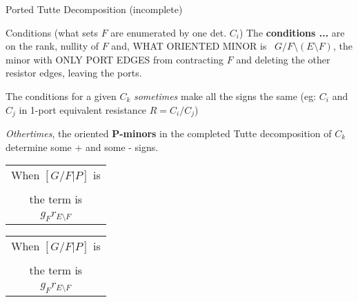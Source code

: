\documentclass{beamer}
\newcommand{\Remph}[1]{{\color{red}#1}}
\begin{document}
\begin{frame}{Ported Tutte Decomposition (incomplete)}
\hspace{-0.2in}\mbox{}
\end{frame}




\begin{frame}{Conditions (what sets $F$ are enumerated by one det. $C_i$)
}
The \textbf{conditions ...}
are on the rank, nullity of $F$ and, WHAT ORIENTED MINOR is \
$G/F\setminus (E\setminus F)$, the minor
with ONLY PORT EDGES from contracting $F$
and deleting the other resistor edges, leaving the
ports.

The conditions for a given $C_k$ \textit{sometimes}
make all the signs the same (eg: $C_i$ and 
$C_j$ in 1-port equivalent resistance $R=C_i/C_j$)

\textit{Othertimes}, the oriented \textbf{P-minors}
in the completed Tutte decomposition of $C_k$ determine
some + and some - signs.

\begin{center}
\begin{minipage}{0.3\textwidth}
\begin{tabular}{c}
When $[G/F|P]$ is \\
 \\
the term is \\
\Remph{{\LARGE\bf +}}$g_Fr_{E\setminus F}$ \\
\end{tabular}
\end{minipage}
\begin{minipage}{0.3\textwidth}
\begin{tabular}{c}
When $[G/F|P]$ is\\
\\
the term is\\
\Remph{{\LARGE\bf -}}$g_Fr_{E\setminus F}$\\
\end{tabular}
\end{minipage}
\end{center}

\end{frame}
\end{document}

